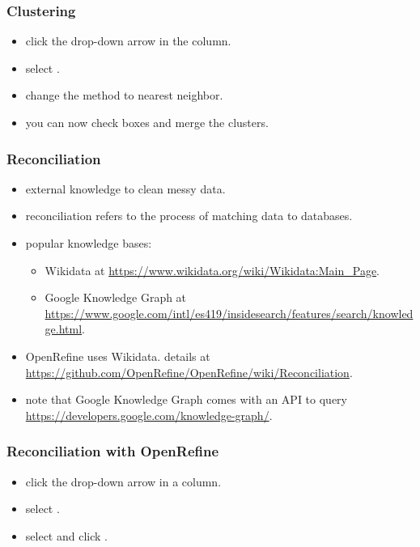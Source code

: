 \documentclass{beamer}					%
\begin{document}
\begin{frame}[c]
\frametitle{Clustering}
\begin{itemize}
\item click the drop-down arrow in the  column.
\item select \say{\textcolor{red}{Edit cells\textgreater Cluster and edit...}}.
\item change the method to nearest neighbor.
\item you can now check boxes and merge the clusters.
\end{itemize}
\end{frame}

\begin{frame}[c]
\frametitle{Reconciliation}
\begin{itemize}
\item external knowledge to clean messy data.
\item reconciliation refers to the process of matching data to databases. 
\item popular knowledge bases: 
\begin{itemize}
\item Wikidata at \footnotesize{\url{https://www.wikidata.org/wiki/Wikidata:Main_Page}}. 
\item Google Knowledge Graph at \footnotesize{\url{https://www.google.com/intl/es419/insidesearch/features/search/knowledge.html}}.
\end{itemize}
\item OpenRefine uses Wikidata. details at \footnotesize{\url{https://github.com/OpenRefine/OpenRefine/wiki/Reconciliation}}.
\item note that Google Knowledge Graph comes with an API to query \footnotesize{\url{https://developers.google.com/knowledge-graph/}}.
\end{itemize}
\end{frame}

\begin{frame}[c]
\frametitle{Reconciliation with OpenRefine}
\begin{itemize}
\item click the drop-down arrow in a column.
\item select \say{\textcolor{red}{Reconcile\textgreater Start reconciling...}}.
\item select \say{\textcolor{red}{Wikidata}} and click \say{\textcolor{red}{Start Reconciling}}.
\end{itemize}
\end{frame}
\end{document}
